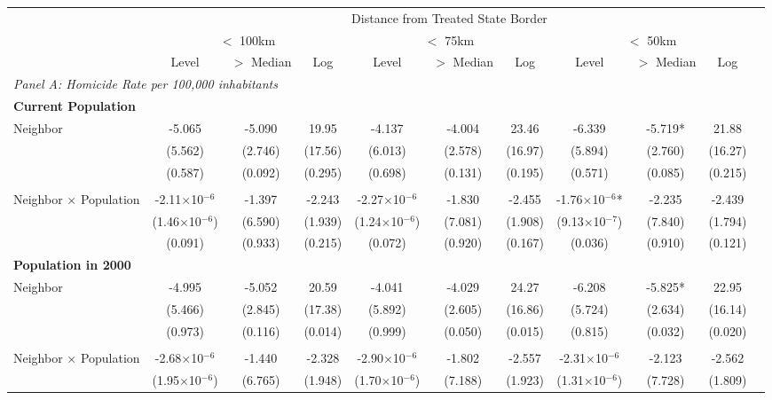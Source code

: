 \documentclass{article}
\begin{document}
\begin{table}[htbp]
\begin{adjustbox}{width=\textwidth}
\begin{tabular}{lcccccccccc}
\toprule
& \multicolumn{9}{c}{Distance from Treated State Border} \\
\cmidrule(lr){2-10}
& \multicolumn{3}{c}{$<$ 100km} & \multicolumn{3}{c}{$<$ 75km} & \multicolumn{3}{c}{$<$ 50km} \\
\cmidrule(lr){2-4} \cmidrule(lr){5-7} \cmidrule(lr){8-10}
& Level & $>$ Median & Log & Level & $>$ Median & Log & Level & $>$ Median & Log \\
\midrule
\multicolumn{10}{l}{\textit{Panel A: Homicide Rate per 100,000 inhabitants}} \\[0.5em]
\multicolumn{10}{l}{\textbf{Current Population}} \\[0.5em]
Neighbor & -5.065 & -5.090 & 19.95 & -4.137 & -4.004 & 23.46 & -6.339 & -5.719* & 21.88 \\
& (5.562) & (2.746) & (17.56) & (6.013) & (2.578) & (16.97) & (5.894) & (2.760) & (16.27) \\
& (0.587) & (0.092) & (0.295) & (0.698) & (0.131) & (0.195) & (0.571) & (0.085) & (0.215) \\\\
Neighbor × Population & -2.11$\times$10$^{-6}$ & -1.397 & -2.243 & -2.27$\times$10$^{-6}$ & -1.830 & -2.455 & -1.76$\times$10$^{-6}$* & -2.235 & -2.439 \\
& (1.46$\times$10$^{-6}$) & (6.590) & (1.939) & (1.24$\times$10$^{-6}$) & (7.081) & (1.908) & (9.13$\times$10$^{-7}$) & (7.840) & (1.794) \\
& (0.091) & (0.933) & (0.215) & (0.072) & (0.920) & (0.167) & (0.036) & (0.910) & (0.121) \\
\multicolumn{10}{l}{\textbf{Population in 2000}} \\[0.5em]
Neighbor & -4.995 & -5.052 & 20.59 & -4.041 & -4.029 & 24.27 & -6.208 & -5.825* & 22.95 \\
& (5.466) & (2.845) & (17.38) & (5.892) & (2.605) & (16.86) & (5.724) & (2.634) & (16.14) \\
& (0.973) & (0.116) & (0.014) & (0.999) & (0.050) & (0.015) & (0.815) & (0.032) & (0.020) \\\\
Neighbor × Population & -2.68$\times$10$^{-6}$ & -1.440 & -2.328 & -2.90$\times$10$^{-6}$ & -1.802 & -2.557 & -2.31$\times$10$^{-6}$ & -2.123 & -2.562 \\
& (1.95$\times$10$^{-6}$) & (6.765) & (1.948) & (1.70$\times$10$^{-6}$) & (7.188) & (1.923) & (1.31$\times$10$^{-6}$) & (7.728) & (1.809) \\

\end{tabular}
\end{adjustbox}
\end{table}
\end{document}
